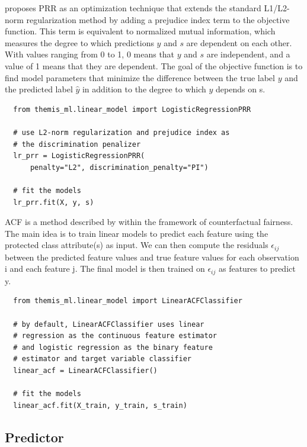 \documentclass{interact}
\begin{document}
\cite{kamishima2012fairness} proposes PRR as an optimization technique that
extends the standard L1/L2-norm regularization method \cite{ng2004feature,
ribeiro2016should} by adding a prejudice index term to the objective function.
This term is equivalent to normalized mutual information, which measures the
degree to which predictions \(y\) and \(s\) are dependent on each other. With
values ranging from 0 to 1, 0 means that \(y\) and \(s\) are independent, and a
value of 1 means that they are dependent. The goal of the objective function is
to find model parameters that minimize the difference between the true label
\(y\) and the predicted label \(\hat{y}\) in addition to the degree to which
\(y\) depends on s.

\begin{verbatim}
  from themis_ml.linear_model import LogisticRegressionPRR

  # use L2-norm regularization and prejudice index as
  # the discrimination penalizer
  lr_prr = LogisticRegressionPRR(
      penalty="L2", discrimination_penalty="PI")

  # fit the models
  lr_prr.fit(X, y, s)
\end{verbatim}

ACF is a method described by \cite{kusner2017counterfactual} within the
framework of counterfactual fairness. The main idea is to train linear models to
predict each feature using the protected class attribute(s) as input. We can
then compute the residuals \(\epsilon_{ij}\) between the predicted feature
values and true feature values for each observation i and each feature j. The
final model is then trained on \(\epsilon_{ij}\) as features to predict y.

\begin{verbatim}
  from themis_ml.linear_model import LinearACFClassifier

  # by default, LinearACFClassifier uses linear
  # regression as the continuous feature estimator
  # and logistic regression as the binary feature
  # estimator and target variable classifier
  linear_acf = LinearACFClassifier()

  # fit the models
  linear_acf.fit(X_train, y_train, s_train)
\end{verbatim}

\subsection{Predictor}
\end{document}
